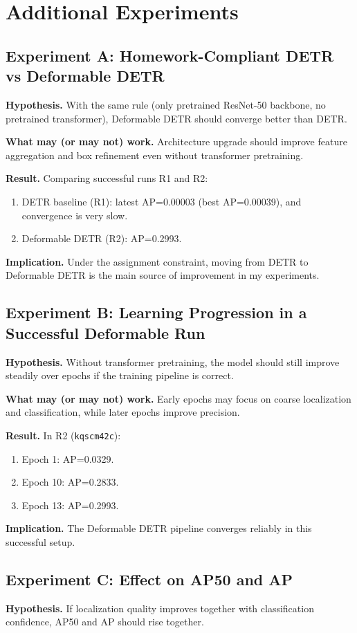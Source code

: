 \section{Additional Experiments}
\subsection{Experiment A: Homework-Compliant DETR vs Deformable DETR}
\textbf{Hypothesis.}
With the same rule (only pretrained ResNet-50 backbone, no pretrained transformer), Deformable DETR should converge better than DETR.

\textbf{What may (or may not) work.}
Architecture upgrade should improve feature aggregation and box refinement even without transformer pretraining.

\textbf{Result.}
Comparing successful runs R1 and R2:
\begin{enumerate}
    \item DETR baseline (R1): latest AP=0.00003 (best AP=0.00039), and convergence is very slow.
    \item Deformable DETR (R2): AP=0.2993.
\end{enumerate}

\textbf{Implication.}
Under the assignment constraint, moving from DETR to Deformable DETR is the main source of improvement in my experiments.

\subsection{Experiment B: Learning Progression in a Successful Deformable Run}
\textbf{Hypothesis.}
Without transformer pretraining, the model should still improve steadily over epochs if the training pipeline is correct.

\textbf{What may (or may not) work.}
Early epochs may focus on coarse localization and classification, while later epochs improve precision.

\textbf{Result.}
In R2 (\texttt{kqscm42c}):
\begin{enumerate}
    \item Epoch 1: AP=0.0329.
    \item Epoch 10: AP=0.2833.
    \item Epoch 13: AP=0.2993.
\end{enumerate}

\textbf{Implication.}
The Deformable DETR pipeline converges reliably in this successful setup.

\subsection{Experiment C: Effect on AP50 and AP}
\textbf{Hypothesis.}
If localization quality improves together with classification confidence, AP50 and AP should rise together.


